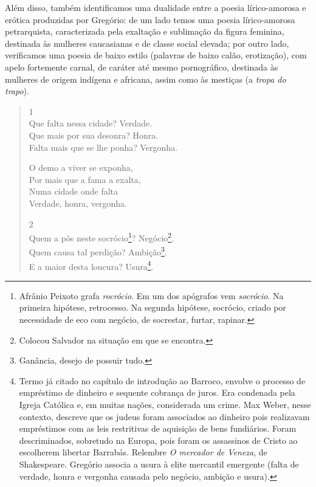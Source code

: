 \documentclass[12pt]{book}
\begin{document}
		\par Além disso, também identificamos uma dualidade entre a poesia lírico-amorosa e erótica produzidas por Gregório: de um lado temos uma poesia lírico-amorosa petrarquista, caracterizada pela exaltação e sublimação da figura feminina, destinada às mulheres caucasianas e de classe social elevada; por outro lado, verificamos uma poesia de baixo estilo (palavras de baixo calão, erotização), com apelo fortemente carnal, de caráter até mesmo pornográfico, destinada às mulheres de origem indígena e africana, assim como às mestiças (a \textit{tropa do trapo}).
		\begin{verse}
			1 \\
			Que falta nessa cidade? \dotfill Verdade. \\
			Que mais por sua desonra? \dotfill Honra. \\
			Falta mais que se lhe ponha? \dotfill Vergonha.
			
			\hspace{5em} O demo a viver se exponha, \\
			\hspace{5em} Por mais que a fama a exalta, \\
			\hspace{5em} Numa cidade onde falta \\
			\hspace{5em} Verdade, honra, vergonha. 
			
			2 \\
			Quem a pôs neste socrócio\footnote{Afrânio Peixoto grafa \textit{rocrócio}. Em um dos apógrafos vem \textit{socrócio}. Na primeira hipótese, retrocesso. Na segunda hipótese, socrócio, criado por necessidade de eco com negócio, de socrestar, furtar, rapinar.}? \dotfill Negócio\footnote{Colocou Salvador na situação em que se encontra.}. \\
			Quem causa tal perdição? \dotfill Ambição\footnote{Ganância, desejo de possuir tudo.}. \\
			E a maior desta loucura? \dotfill Usura\footnote{Termo já citado no capítulo de introdução ao Barroco, envolve o processo de empréstimo de dinheiro e sequente cobrança de juros. Era condenada pela Igreja Católica e, em muitas nações, considerada um crime. Max Weber, nesse contexto, descreve que os judeus foram associados ao dinheiro pois realizavam empréstimos com as leis restritivas de aquisição de bens fundiários. Foram descriminados, sobretudo na Europa, pois foram os assassinos de Cristo ao escolherem libertar Barrabás. Relembre \textit{O mercador de Veneza}, de Shakespeare. Gregório associa a usura à elite mercantil emergente (falta de verdade, honra e vergonha causada pelo negócio, ambição e usura).}.
			

\end{verse}
\end{document}
